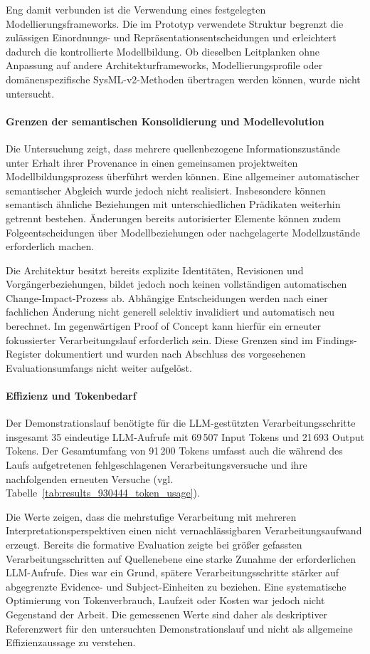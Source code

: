 Eng damit verbunden ist die Verwendung eines festgelegten
Modellierungsframeworks. Die im Prototyp verwendete Struktur begrenzt die
zulässigen Einordnungs- und Repräsentationsentscheidungen und erleichtert
dadurch die kontrollierte Modellbildung. Ob dieselben Leitplanken ohne
Anpassung auf andere Architekturframeworks, Modellierungsprofile oder
domänenspezifische SysML-v2-Methoden übertragen werden können, wurde nicht
untersucht.

\paragraph{Grenzen der semantischen Konsolidierung und Modellevolution}

Die Untersuchung zeigt, dass mehrere quellenbezogene Informationszustände
unter Erhalt ihrer Provenance in einen gemeinsamen projektweiten
Modellbildungsprozess überführt werden können. Eine allgemeiner automatischer
semantischer Abgleich wurde jedoch nicht realisiert. Insbesondere
können semantisch ähnliche Beziehungen mit unterschiedlichen Prädikaten
weiterhin getrennt bestehen. Änderungen bereits autorisierter Elemente
können zudem Folgeentscheidungen über Modellbeziehungen oder nachgelagerte
Modellzustände erforderlich machen.

Die Architektur besitzt bereits explizite Identitäten, Revisionen und
Vorgängerbeziehungen, bildet jedoch noch keinen vollständigen automatischen
Change-Impact-Prozess ab. Abhängige Entscheidungen werden nach einer
fachlichen Änderung nicht generell selektiv invalidiert und automatisch neu
berechnet. Im gegenwärtigen Proof of Concept kann hierfür ein erneuter
fokussierter Verarbeitungslauf erforderlich sein. Diese Grenzen sind im
Findings-Register dokumentiert und wurden nach Abschluss des vorgesehenen
Evaluationsumfangs nicht weiter aufgelöst.

\paragraph{Effizienz und Tokenbedarf}

Der Demonstrationslauf benötigte für die LLM-gestützten
Verarbeitungsschritte insgesamt 35 eindeutige LLM-Aufrufe mit 69\,507 Input
Tokens und 21\,693 Output Tokens. Der Gesamtumfang von 91\,200 Tokens umfasst
auch die während des Laufs aufgetretenen fehlgeschlagenen Verarbeitungsversuche
und ihre nachfolgenden erneuten Versuche
(vgl. Tabelle~\ref{tab:results_930444_token_usage}).

Die Werte zeigen, dass die mehrstufige Verarbeitung mit mehreren
Interpretationsperspektiven einen nicht vernachlässigbaren
Verarbeitungsaufwand erzeugt. Bereits die formative Evaluation zeigte bei
größer gefassten Verarbeitungsschritten auf Quellenebene eine starke Zunahme
der erforderlichen LLM-Aufrufe. Dies war ein Grund, spätere
Verarbeitungsschritte stärker auf abgegrenzte Evidence- und Subject-Einheiten
zu beziehen. Eine systematische Optimierung von Tokenverbrauch, Laufzeit oder
Kosten war jedoch nicht Gegenstand der Arbeit. Die gemessenen Werte sind daher als 
deskriptiver Referenzwert für den untersuchten Demonstrationslauf und nicht als 
allgemeine Effizienzaussage zu verstehen.

